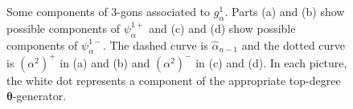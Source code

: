 \documentclass[11pt]{article}
\theoremstyle{plain} \newtheorem{thm}{Theorem}[subsection]
\theoremstyle{plain} \newtheorem{cor}[thm]{Corollary}
\theoremstyle{plain} \newtheorem{prop}[thm]{Proposition}
\theoremstyle{plain} \newtheorem{conj}[thm]{Conjecture}
\theoremstyle{plain} \newtheorem{lem}[thm]{Lemma}
\theoremstyle{definition} \newtheorem{df}[thm]{Definition}
\theoremstyle{remark} \newtheorem{rmk}[thm]{Remark}
\theoremstyle{remark} \newtheorem{obs}[thm]{Observation}
\newcommand{\ah}{\widehat{\alpha}}
\numberwithin{equation}{section}
\begin{document}
\begin{figure}[h]
\centering
{}\quad
{}
\quad
{}
\caption[Components of 3-gons for $g_{\alpha}^1$ in the proof of Lemma \ref{lem:RredR}]{ Some components of 3-gons associated to $g_{\alpha}^1$.  Parts (a) and (b) show possible components of $\psi_{\alpha}^{1+}$ and (c) and (d) show possible components of $\psi_{\alpha}^{1-}$.  The dashed curve is $\ah_{n-1}$ and the dotted curve is $(\alpha^2)^+$ in (a) and (b) and $(\alpha^2)^-$ in (c) and (d).  In each picture, the white dot represents a component of the appropriate top-degree $\boldsymbol{\theta}$-generator.\label{fig:ra1tri}}
\end{figure}
\end{document}
